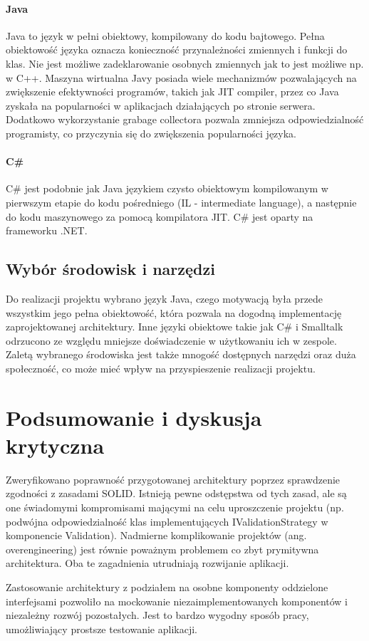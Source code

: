 \documentclass[12pt]{article}
\begin{document}
\paragraph{Java}
Java to język w pełni obiektowy, kompilowany do kodu bajtowego. Pełna obiektowość języka oznacza konieczność przynależności zmiennych i funkcji do klas. Nie jest możliwe zadeklarowanie osobnych zmiennych jak to jest możliwe np. w C++. Maszyna wirtualna Javy posiada wiele mechanizmów pozwalających na zwiększenie efektywności programów, takich jak JIT compiler, przez co Java zyskała na popularności w aplikacjach działających po stronie serwera. Dodatkowo wykorzystanie grabage collectora pozwala zmniejsza odpowiedzialność programisty, co przyczynia się do zwiększenia popularności języka.

\paragraph{C\#}
C\# jest podobnie jak Java językiem czysto obiektowym kompilowanym w pierwszym etapie do kodu pośredniego (IL - intermediate language), a następnie do kodu maszynowego za pomocą kompilatora JIT. C\# jest oparty na frameworku .NET.

\subsection{Wybór środowisk i narzędzi}
Do realizacji projektu wybrano język Java, czego motywacją była przede wszystkim jego pełna obiektowość, która pozwala na dogodną implementację zaprojektowanej architektury.
Inne języki obiektowe takie jak C\# i Smalltalk odrzucono ze względu mniejsze doświadczenie w użytkowaniu ich w zespole.
Zaletą wybranego środowiska jest także mnogość dostępnych narzędzi oraz duża społeczność, co może mieć wpływ na przyspieszenie realizacji projektu.


\section{Podsumowanie i dyskusja krytyczna}

Zweryfikowano poprawność przygotowanej architektury poprzez sprawdzenie zgodności z zasadami SOLID. Istnieją pewne odstępstwa od tych zasad, ale są one świadomymi kompromisami mającymi na celu uproszczenie projektu (np. podwójna odpowiedzialność klas implementujących IValidationStrategy w komponencie Validation). Nadmierne komplikowanie projektów (ang. overengineering) jest równie poważnym problemem co zbyt prymitywna architektura. Oba te zagadnienia utrudniają rozwijanie aplikacji.

Zastosowanie architektury z podziałem na osobne komponenty oddzielone interfejsami pozwoliło na mockowanie niezaimplementowanych komponentów i niezależny rozwój pozostałych. Jest to bardzo wygodny sposób pracy, umożliwiający prostsze testowanie aplikacji.



\newpage
\listoffigures
\end{document}
